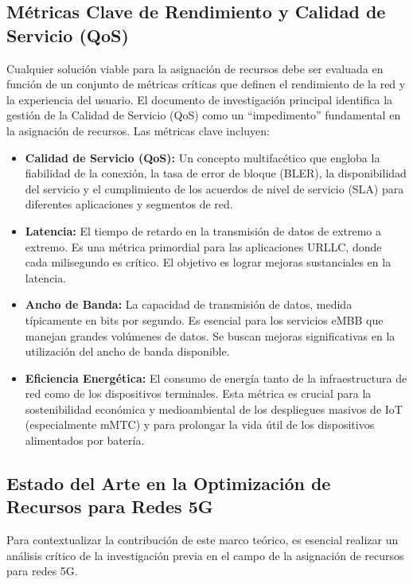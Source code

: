 \documentclass[12pt,a4paper]{article}
\begin{document}
\subsection{Métricas Clave de Rendimiento y Calidad de Servicio (QoS)}

Cualquier solución viable para la asignación de recursos debe ser evaluada en función de un conjunto de métricas críticas que definen el rendimiento de la red y la experiencia del usuario. El documento de investigación principal identifica la gestión de la Calidad de Servicio (QoS) como un ``impedimento'' fundamental en la asignación de recursos. Las métricas clave incluyen:

\begin{itemize}
    \item \textbf{Calidad de Servicio (QoS):} Un concepto multifacético que engloba la fiabilidad de la conexión, la tasa de error de bloque (BLER), la disponibilidad del servicio y el cumplimiento de los acuerdos de nivel de servicio (SLA) para diferentes aplicaciones y segmentos de red\cite{ref16}.
    
    \item \textbf{Latencia:} El tiempo de retardo en la transmisión de datos de extremo a extremo. Es una métrica primordial para las aplicaciones URLLC, donde cada milisegundo es crítico. El objetivo es lograr mejoras sustanciales en la latencia.
    
    \item \textbf{Ancho de Banda:} La capacidad de transmisión de datos, medida típicamente en bits por segundo. Es esencial para los servicios eMBB que manejan grandes volúmenes de datos. Se buscan mejoras significativas en la utilización del ancho de banda disponible.
    
    \item \textbf{Eficiencia Energética:} El consumo de energía tanto de la infraestructura de red como de los dispositivos terminales. Esta métrica es crucial para la sostenibilidad económica y medioambiental de los despliegues masivos de IoT (especialmente mMTC) y para prolongar la vida útil de los dispositivos alimentados por batería.
\end{itemize}

\subsection{Estado del Arte en la Optimización de Recursos para Redes 5G}

Para contextualizar la contribución de este marco teórico, es esencial realizar un análisis crítico de la investigación previa en el campo de la asignación de recursos para redes 5G.
\end{document}
